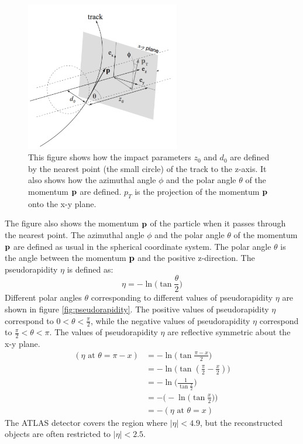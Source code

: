 \begin{figure}
\centering
\includegraphics[width=0.6\textwidth]{data/photo/detector/impact_parameter.png}
\caption{This figure shows how the impact parameters $z_0$ and $d_0$ are defined by the nearest point (the small circle) of the track to the z-axis. It also shows how the azimuthal angle $\phi$ and the polar angle $\theta$ of the momentum $\bf{p}$ are defined. $p_T$ is the projection of the momentum $\bf{p}$ onto the x-y plane.}
\label{fig:impact_parameter}
\end{figure}

The figure also shows the momentum $\bf{p}$ of the particle when it passes through the nearest point.
The azimuthal angle $\phi$ and the polar angle $\theta$ of the momentum $\bf{p}$ are defined as usual in the spherical coordinate system.
The polar angle $\theta$ is the angle between the momentum $\bf{p}$ and the positive z-direction.
The pseudorapidity $\eta$ is defined as:
\begin{equation}
\eta = - \ln \Big( \tan \frac{\theta}{2} \Big)
\end{equation}
Different polar angles $\theta$ corresponding to different values of pseudorapidity $\eta$ are shown in figure \ref{fig:pseudorapidity}.
The positive values of pseudorapidity $\eta$ correspond to $0 <\theta< \frac{\pi}{2}$, while the negative values of pseudorapidity $\eta$ correspond to $\frac{\pi}{2} <\theta< \pi$.
The values of pseudorapidity $\eta$ are reflective symmetric about the x-y plane.
\begin{align}
( \eta \text{ at } \theta = \pi - x) &= - \ln \Big( \tan \frac{\pi - x}{2} \Big) \\
&= - \ln \Big( \tan (\frac{\pi}{2} - \frac{x}{2}) \Big) \\
&= - \ln \Big( \frac{1}{ \tan \frac{x}{2} } \Big) \\
&= - \Big( - \ln \Big( \tan \frac{x}{2} \Big) \Big) \\
&= - ( \eta \text{ at } \theta = x)
\end{align}
The ATLAS detector covers the region where $|\eta| < 4.9$, but the reconstructed objects are often restricted to $|\eta| < 2.5$.

